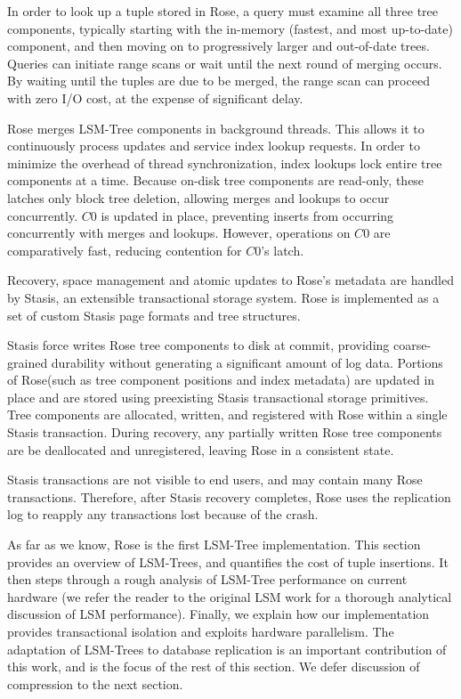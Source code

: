 \documentclass{vldb}
\newcommand{\rows}{Rose\xspace}
\newcommand{\rowss}{Rose's\xspace}
\begin{document}
In order to look up a tuple stored in \rows, a query must examine all
three tree components, typically starting with the in-memory (fastest, and most
up-to-date) component, and then moving on to progressively larger and
out-of-date trees.  Queries can initiate range scans or wait until the next round
of merging occurs.  By waiting until the tuples are due to be merged, the
range scan can proceed with zero I/O cost, at the expense of significant
delay.

\rows merges LSM-Tree components in background threads.  This allows
it to continuously process updates and service index lookup requests.
In order to minimize the overhead of thread synchronization, index
lookups lock entire tree components at a time.  Because on-disk tree
components are read-only, these latches only block tree deletion,
allowing merges and lookups to occur concurrently.  $C0$ is
updated in place, preventing inserts from occurring concurrently with
merges and lookups.  However, operations on $C0$ are comparatively
fast, reducing contention for $C0$'s latch.

Recovery, space management and atomic updates to \rowss metadata are
handled by Stasis\cite{stasis}, an extensible transactional storage system.  \rows is
implemented as a set of custom Stasis page formats and tree structures.

Stasis force writes \rows tree components to disk at commit, providing
coarse-grained durability without generating a significant amount of
log data.  Portions of \rows (such as tree component
positions and index metadata) are updated in place and are stored using preexisting Stasis transactional
storage primitives.  Tree components are allocated, written, and
registered with \rows within a single Stasis transaction.  During
recovery, any partially written \rows tree components are be
deallocated and unregistered, leaving \rows in a consistent state.

Stasis transactions are not visible to end users, and may contain many
\rows transactions.  Therefore, after Stasis recovery completes, \rows
uses the replication log to reapply any transactions lost because of the
crash.

As far as we know, \rows is the first LSM-Tree implementation.  This
section provides an overview of LSM-Trees, and
quantifies the cost of tuple insertions.  It then steps through a rough
analysis of LSM-Tree performance on current hardware (we refer the
reader to the original LSM work for a thorough analytical discussion
of LSM performance).  Finally, we explain how our implementation
provides transactional isolation and exploits hardware parallelism.
The adaptation of LSM-Trees to database
replication is an important contribution of this work, and is the
focus of the rest of this section.  We defer discussion of compression
to the next section.
\end{document}

